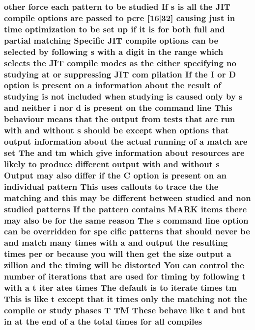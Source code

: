 \subsubsection[{\texorpdfstring{compiles}{compiles}}]{ other force each {\bf pattern} {\bf to} {\bf be} {\bf studied} If {\bf s} {\bf is} {\bf all} the J\+IT {\bf compile} {\bf options} {\bf are} passed {\bf to} {\bf pcre} \mbox{[}16$\vert$32\mbox{]} causing just {\bf in} {\bf time} optimization {\bf to} {\bf be} {\bf set} up {\bf if} {\bf it} {\bf is} for both full and {\bf partial} {\bf matching} Specific J\+IT {\bf compile} {\bf options} {\bf can} {\bf be} {\bf selected} by following {\bf s} {\bf with} {\bf a} digit {\bf in} the range {\bf which} selects the J\+IT {\bf compile} {\bf modes} {\bf as} the either {\bf specifying} no {\bf studying} at {\bf or} suppressing J\+IT com pilation If the {\bf I} {\bf or} {\bf D} {\bf option} {\bf is} {\bf present} {\bf on} {\bf a} information about the {\bf result} {\bf of} {\bf studying} {\bf is} {\bf not} {\bf included} when {\bf studying} {\bf is} caused only by {\bf s} and neither {\bf i} nor {\bf d} {\bf is} {\bf present} {\bf on} the {\bf command} {\bf line} This behaviour means that the {\bf output} {\bf from} {\bf tests} that {\bf are} {\bf run} {\bf with} and without {\bf s} should {\bf be} {\bf except} when {\bf options} that {\bf output} information about the actual running {\bf of} {\bf a} {\bf match} {\bf are} {\bf set} The and {\bf tm} {\bf which} give information about resources {\bf are} likely {\bf to} produce different {\bf output} {\bf with} and without {\bf s} Output may also differ {\bf if} the {\bf C} {\bf option} {\bf is} {\bf present} {\bf on} an individual {\bf pattern} This uses callouts {\bf to} trace the the {\bf matching} and {\bf this} may {\bf be} different between {\bf studied} and non {\bf studied} {\bf patterns} If the {\bf pattern} {\bf contains} M\+A\+RK items there may also {\bf be} for the same {\bf reason} The {\bf s} {\bf command} {\bf line} {\bf option} {\bf can} {\bf be} overridden for spe cific {\bf patterns} that should never {\bf be} and {\bf match} many {\bf times} {\bf with} {\bf a} and {\bf output} the resulting {\bf times} per {\bf or} because you will then get the {\bf size} {\bf output} {\bf a} zillion and the timing will {\bf be} distorted You {\bf can} control the {\bf number} {\bf of} iterations that {\bf are} {\bf used} for timing by following {\bf t} {\bf with} {\bf a} {\bf t} {\bf iter} ates {\bf times} The {\bf default} {\bf is} {\bf to} iterate {\bf times} {\bf tm} This {\bf is} like {\bf t} {\bf except} that {\bf it} {\bf times} only the {\bf matching} {\bf not} the {\bf compile} {\bf or} {\bf study} phases {\bf T} TM These behave like {\bf t} and but {\bf in} at the {\bf end} {\bf of} {\bf a} the total {\bf times} for {\bf all} compiles}\hypertarget{pcretest_8txt_a533d7d27266984bb57522f588fa33e90}{}\label{pcretest_8txt_a533d7d27266984bb57522f588fa33e90}
